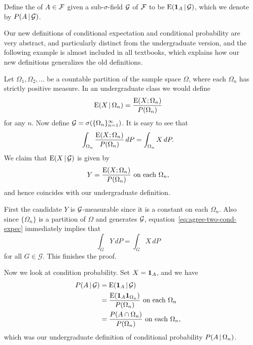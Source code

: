 \begin{defn}
    Define the  of $A \in \mathcal{F}$ given a sub-$\sigma$-field $\mathcal{G}$ of $\mathcal{F}$ to be $\mathop{}\!\mathrm{E}(\mathbf{1}_A \,|\, \mathcal{G})$, which we denote by $P(A\,|\, \mathcal{G})$.
\end{defn}


Our new definitions of conditional expectation and conditional probability are very abstract, and particularly distinct from the undergraduate version, and the following example is almost included in all textbooks, which explains how our new definitions generalizes the old definitions.

\begin{exa}
    Let $\Omega_1,\Omega_2,\dotsc$ be a countable partition of the sample space $\Omega$, where each $\Omega_n$ has strictly positive measure. In an undergraduate class we would define \[
        \mathop{}\!\mathrm{E}(X\,|\, \Omega_n) = \frac{\mathop{}\!\mathrm{E}(X;\Omega_n)}{P(\Omega_n)}
    \] for any $n$. Now define $\mathcal{G} = \sigma(\{\Omega_n\}_{n=1}^\infty)$. It is easy to see that \begin{equation} \label{eq:agree-two-cond-expec}
        \int_{\Omega_n} \frac{\mathop{}\!\mathrm{E}(X;\Omega_n)}{P(\Omega_n)} \,dP = \int_{\Omega_n} X\,dP.
    \end{equation} We claim that $\mathop{}\!\mathrm{E}(X\,|\, \mathcal{G})$ is given by \[
        Y = \frac{\mathop{}\!\mathrm{E}(X;\Omega_n)}{P(\Omega_n)} \text{ on each }\Omega_n,
    \] and hence coincides with our undergraduate definition.

    First the candidate $Y$ is $\mathcal{G}$-measurable since it is a constant on each $\Omega_n$. Also since $\{\Omega_n\}$ is a partition of $\Omega$ and generates $\mathcal{G}$, equation~\eqref{eq:agree-two-cond-expec} immediately implies that \[
        \int_G Y\,dP = \int_G X\,dP
    \] for all $G\in \mathcal{G}$. This finishes the proof.

    Now we look at condition probability. Set $X = \mathbf{1}_A$, and we have \begin{align*}
        P(A \,|\, \mathcal{G}) & = \mathop{}\!\mathrm{E}(\mathbf{1}_A\,|\,\mathcal{G}) \\ & = \frac{\mathop{}\!\mathrm{E}(\mathbf{1}_A\mathbf{1}_{\Omega_n})}{P(\Omega_n)} \text{ on each }\Omega_n \\ & = \frac{P(A\cap \Omega_n)}{P(\Omega_n)} \text{ on each }\Omega_n,
    \end{align*} which was our undergraduate definition of conditional probability $P(A\,|\, \Omega_n)$.
\end{exa}

